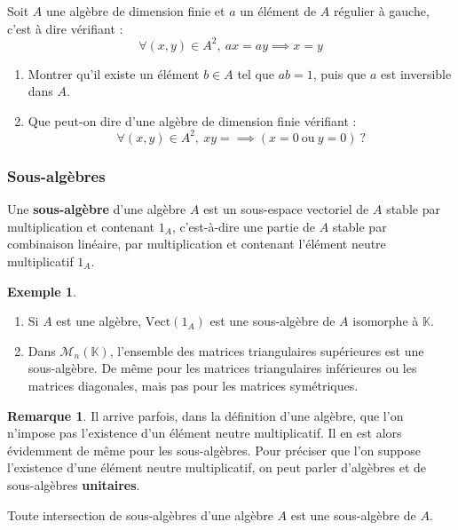 \documentclass[french]{article}
\newcommand{\K}{\mathbb{K}}
\newcommand{\Vect}{\text{Vect}}
\theoremstyle{plain}
\theoremstyle{definition}
\newtheorem*{ex}{Exemple}
\newtheorem*{rmq}{Remarque}
\theoremstyle{remark}
\begin{document}
\begin{exo}
	Soit $A$ une algèbre de dimension finie et $a$ un élément de $A$ régulier à gauche, c'est à dire vérifiant : $$\forall (x,y)\in A^2,\ ax=ay\implies x=y$$
	\begin{enumerate}
		\item Montrer qu'il existe un élément $b\in A$ tel que $ab=1$, puis que $a$ est inversible dans $A$.
		\item Que peut-on dire d'une algèbre de dimension finie vérifiant : $$\forall (x,y)\in A^2,\ xy=\implies (x=0\ \text{ou}\ y=0)\ ?$$
	\end{enumerate}
\end{exo}

\subsubsection*{Sous-algèbres}

\begin{dfn}
	Une \textbf{sous-algèbre} d'une algèbre $A$ est un sous-espace vectoriel de $A$ stable par multiplication et contenant $1_A$, c'est-à-dire une partie de $A$ stable par combinaison linéaire, par multiplication et contenant l'élément neutre multiplicatif $1_A$.
\end{dfn}

\begin{ex}
	\begin{enumerate}
		\item Si $A$ est une algèbre, $\Vect(1_A)$ est une sous-algèbre de $A$ isomorphe à $\K$.
		\item Dans $\mathcal{M}_n(\K)$, l'ensemble des matrices triangulaires supérieures est une sous-algèbre. De même pour les matrices triangulaires inférieures ou les matrices diagonales, mais pas pour les matrices symétriques.
	\end{enumerate}
\end{ex}

\begin{rmq}
	Il arrive parfois, dans la définition d'une algèbre, que l'on n'impose pas l'existence d'un élément neutre multiplicatif. Il en est alors évidemment de même pour les sous-algèbres. Pour préciser que l'on suppose l'existence d'une élément neutre multiplicatif, on peut parler d'algèbres et de sous-algèbres \textbf{unitaires}.
\end{rmq}

\begin{prop}%
	Toute intersection de sous-algèbres d'une algèbre $A$ est une sous-algèbre de $A$.
\end{prop}
\end{document}
